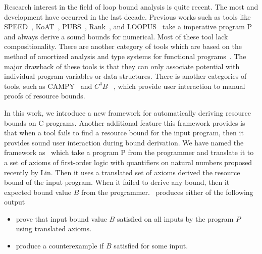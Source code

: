 Research interest in the field of loop bound analysis is quite recent. The most and development have occurred in the last decade. Previous works such as tools like SPEED~\cite{speed1}, KoAT~\cite{Brockschmidt:2016:ARS:2982214.2866575}, PUBS~\cite{Albert:2012:CAO:2076807.2077025}, Rank~\cite{Alias:2010:MRP:1882094.1882102}, and LOOPUS~\cite{10.1007/978-3-319-08867-9_50} take a
imperative program P and always derive a sound bounds for numerical. Most of these tool lack compositionality. There are another category of tools which are based on the method
of amortized analysis and type systems for functional programs~\cite{Hoffmann:2012:MAR:2362389.2362393,Hofmann:2003:SPH:604131.604148,Hofmann:2006:TAH:2182132.2182135}. The major drawback of these tools is that they
can only associate potential with individual program variables or data structures. There is another categories of tools, such as CAMPY~\cite{Srikanth:2017:CVU:3009837.3009864} and $C^{4}B$~\cite{Carbonneaux:2015:CCR:2737924.2737955} , which provide user interaction to manual proofs of resource bounds. 


In this work, we introduce a new framework for automatically deriving resource bounds on C programs. Another additional feature this framework provides is that when a tool fails to find a resource bound for the input program, then it provides sound user interaction during bound derivation. We have named the framework as \SystemName\ which take a program P from the programmer and translate it to a set of axioms of first-order logic with quantifiers on natural numbers proposed recently by Lin. Then it uses a translated set of axioms derived the resource bound of the input program. When it failed to derive any bound, then it expected bound value $B$ from the programmer. \SystemName\ produces either  of the following output
\begin{itemize}
	\item prove that input bound value $B$ satisfied on all inputs by the program $P$ using translated axioms.
	\item produce a counterexample if $B$ satisfied for some input.
\end{itemize}


